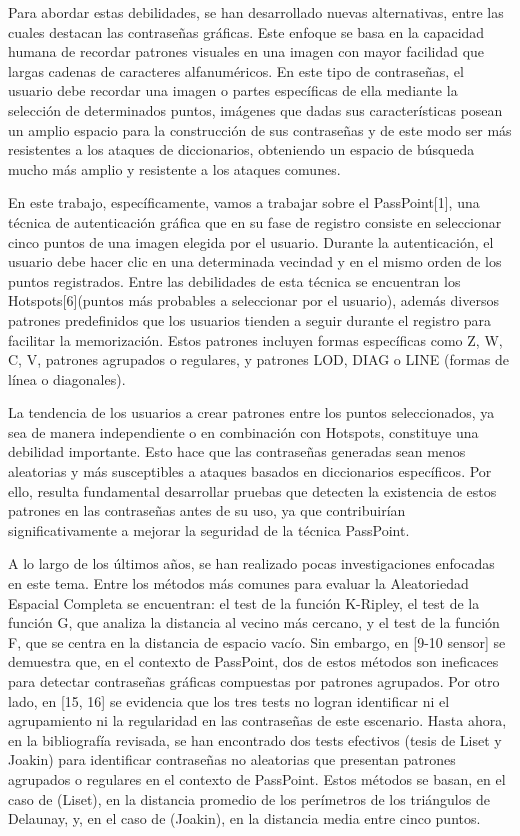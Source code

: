 \documentclass[12pt]{report}
\begin{document}
	Para abordar estas debilidades, se han desarrollado nuevas alternativas, entre las cuales destacan las contraseñas gráficas. Este enfoque se basa en la capacidad humana de recordar patrones visuales en una imagen con mayor facilidad que largas cadenas de caracteres alfanuméricos. En este tipo de contraseñas, el usuario debe recordar una imagen o partes específicas de ella mediante la selección  de determinados puntos, imágenes que dadas sus características posean un amplio espacio para la construcción de sus contraseñas y de este modo ser más resistentes a los ataques de diccionarios, obteniendo un espacio de búsqueda mucho más amplio y resistente a los ataques comunes.
	
	En este trabajo, específicamente, vamos a trabajar sobre el PassPoint[1], una técnica de autenticación gráfica que en su fase de registro consiste en seleccionar cinco puntos de una imagen elegida por el usuario. Durante la autenticación, el usuario debe hacer clic en una determinada vecindad y en el mismo orden de los puntos registrados. Entre las debilidades de esta técnica se encuentran los Hotspots[6](puntos más probables a seleccionar por el usuario), además diversos patrones predefinidos que los usuarios tienden a seguir durante el registro para facilitar la memorización. Estos patrones incluyen formas específicas como Z, W, C, V, patrones agrupados o regulares, y patrones LOD, DIAG o LINE (formas de línea o diagonales).
	
	La tendencia de los usuarios a crear patrones entre los puntos seleccionados, ya sea de manera independiente o en combinación con Hotspots, constituye una debilidad importante. Esto hace que las contraseñas generadas sean menos aleatorias y más susceptibles a ataques basados en diccionarios específicos. Por ello, resulta fundamental desarrollar pruebas que detecten la existencia de estos patrones en las contraseñas antes de su uso, ya que contribuirían significativamente a mejorar la seguridad de la técnica PassPoint.
	
	

	A lo largo de los últimos años, se han realizado pocas investigaciones enfocadas en este tema. Entre los métodos más comunes para evaluar la Aleatoriedad Espacial Completa se encuentran: el test de la función K-Ripley, el test de la función G, que analiza la distancia al vecino más cercano, y el test de la función F, que se centra en la distancia de espacio vacío. Sin embargo, en [9-10 sensor] se demuestra que, en el contexto de PassPoint, dos de estos métodos son ineficaces para detectar contraseñas gráficas compuestas por patrones agrupados. Por otro lado, en [15, 16] se evidencia que los tres tests no logran identificar ni el agrupamiento ni la regularidad en las contraseñas de este escenario. Hasta ahora, en la bibliografía revisada, se han encontrado dos tests efectivos (tesis de Liset y Joakin) para identificar contraseñas no aleatorias que presentan patrones agrupados o regulares en el contexto de PassPoint. Estos métodos se basan, en el caso de (Liset), en la distancia promedio de los perímetros de los triángulos de Delaunay, y, en el caso de (Joakin), en la distancia media entre cinco puntos.
	
\end{document}
